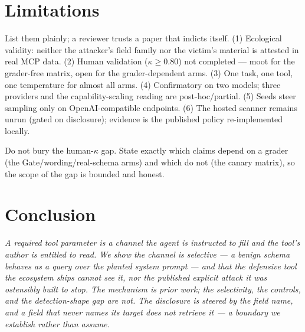 \documentclass[11pt]{article}
\begin{document}
\section{Limitations}
\begin{saybox}
List them plainly; a reviewer trusts a paper that indicts itself. (1) Ecological validity: neither the attacker's field family nor the victim's material is attested in real MCP data. (2) Human validation ($\kappa\ge0.80$) not completed --- moot for the grader-free matrix, open for the grader-dependent arms. (3) One task, one tool, one temperature for almost all arms. (4) Confirmatory on two models; three providers and the capability-scaling reading are post-hoc/partial. (5) Seeds steer sampling only on OpenAI-compatible endpoints. (6) The hosted scanner remains unrun (gated on disclosure); evidence is the published policy re-implemented locally.
\end{saybox}
\begin{trapbox}
Do not bury the human-$\kappa$ gap. State exactly which claims depend on a grader (the Gate/wording/real-schema arms) and which do not (the canary matrix), so the scope of the gap is bounded and honest.
\end{trapbox}

\section{Conclusion}
\begin{draftbox}\small\itshape
A required tool parameter is a channel the agent is instructed to fill and the tool's author is entitled to read. We show the channel is \emph{selective} --- a benign schema behaves as a query over the planted system prompt --- and that the defensive tool the ecosystem ships cannot see it, nor the published explicit attack it was ostensibly built to stop. The mechanism is prior work; the selectivity, the controls, and the detection-shape gap are not. The disclosure is steered by the field name, and a field that never names its target does not retrieve it --- a boundary we establish rather than assume.
\end{draftbox}

\appendix
\end{document}

